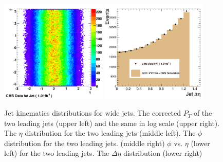 \begin{figure}[!ht]
\begin{center}
    \includegraphics[width=0.45\textwidth]{Figures/c_Eta_Phi_Scatter_fat.pdf}
    \includegraphics[width=0.45\textwidth]{Figures/c_DEta_fat.pdf}

    \caption{ Jet kinematics distributions for wide jets.  The corrected $P_T$ of
      the two leading jets (upper left) and the same in log scale
      (upper right). The $\eta$ distribution for the two leading jets
      (middle left). The $\phi$ distribution for the two leading
      jets. (middle right) $\phi$ vs. $\eta$ (lower left) for the two
      leading jets. The $\Delta\eta$ distribution (lower right) }
    \label{jet_kinematics_wide}
  \end{center}
\end{figure}
%
